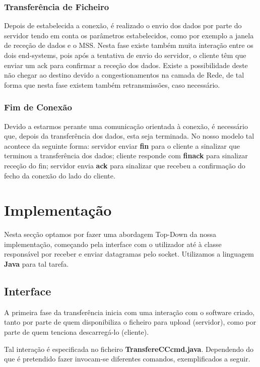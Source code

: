 \documentclass{llncs}
\begin{document}
\subsubsection{Transferência de Ficheiro}

Depois de estabelecida a conexão, é realizado o envio dos dados por parte do servidor tendo em conta os parâmetros estabelecidos, como por exemplo a janela de receção de dados e o MSS. Nesta fase existe também muita interação entre os dois end-systems, pois após a tentativa de envio do servidor, o cliente têm que enviar um ack para confirmar a receção dos dados. Existe a possibilidade deste não chegar ao destino devido a congestionamentos na camada de Rede, de tal forma que nesta fase existem também retransmissões, caso necessário.

\subsubsection{Fim de Conexão}

Devido a estarmos perante uma comunicação orientada à conexão, é necessário que, depois da transferência dos dados, esta seja terminada. No nosso modelo tal acontece da seguinte forma: servidor enviar \textbf{fin} para o cliente a sinalizar que terminou a transferência dos dados; cliente responde com \textbf{finack} para sinalizar receção do fin; servidor envia \textbf{ack} para sinalizar que recebeu a confirmação do fecho da conexão do lado do cliente.



\section{Implementação}

Nesta secção optamos por fazer uma abordagem Top-Down da nossa implementação, começando pela interface com o utilizador até à classe responsável por receber e enviar datagramas pelo socket. Utilizamos a linguagem \textbf{Java} para tal tarefa.


\subsection{Interface}

A primeira fase da transferência inicia com uma interação com o software criado, tanto por parte de quem disponibiliza o ficheiro para upload (servidor), como por parte de quem tenciona descarregá-lo (cliente).

Tal interação é especificada no ficheiro \textbf{TransfereCCcmd.java}. Dependendo do que é pretendido fazer invocam-se diferentes comandos, exemplificados a seguir.
\end{document}
